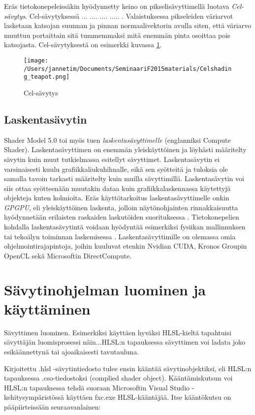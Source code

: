 \documentclass[finnish]{tktltiki2}
\theoremstyle{definition}
\theoremstyle{remark}
\begin{document}
Eräs tietokonepeleissäkin hyödynnetty keino on pikselisävyttimellä luotava \emph{Cel-sävytys}. Cel-sävytyksessä  ... .... .... ..... . Valaistuksessa pikseleiden väriarvot lasketaan katsojan suunnan ja pinnan normaalivektorin avulla siten, että väriarvo muuttuu portaittain sitä tummemmaksi mitä enemmän pinta osoittaa pois katsojasta. Cel-sävytyksestä on esimerkki kuvassa \ref{Cel}.

\begin{figure}[!htbp]
\texttt{[image: /Users/jannetim/Documents/SeminaariF2015materials/Celshading\_teapot.png]}
\caption{Cel-sävytys}
\label{Cel}
\end{figure}

\subsection{Laskentasävytin}

Shader Model 5.0 toi myös tuen \emph{laskentasävyttimelle} (englanniksi Compute Shader). Laskentasävyttimen on enemmän yleiskäyttöinen ja löyhästi määritelty sävytin kuin muut tutkielmassa esitellyt sävyttimet. Laskentasävytin ei varsinaisesti kuulu grafiikkaliukuhihnalle, eikä sen syötteitä ja tuloksia ole samalla tavoin tarkasti määritelty kuin muilla sävyttimillä. Laskentasävytin voi siis ottaa syötteenään muutakin dataa kuin grafiikkalaskennassa käytettyjä objekteja kuten kolmioita. Eräs käyttötarkoitus laskentasävyttimelle onkin \emph{GPGPU}, eli yleiskäyttöinen laskenta, jolloin näytönohjainten rinnakkaisuutta hyödynnetään erilaisten raskaiden laskutöiden suorituksessa \cite{Uni15}. Tietokonepelien kohdalla laskentasävytintä voidaan hyödyntää esimerkiksi fysiikan mallinnuksen tai tekoälyn toiminnan laskemisessa \cite[Luku: Compute Shader Overview]{Mic11}. Laskentasävyttimille on olemassa omia ohjelmointirajapintoja, joihin kuuluvat etenkin Nvidian CUDA, Kronos Groupin OpenCL sekä Microsoftin DirectCompute.

\section{Sävytinohjelman luominen ja käyttäminen}

Sävyttimen luominen. Esimerkiksi käyttäen hyväksi HLSL-kieltä tapahtuisi sävyttäjän luomisprosessi näin...HLSL:n tapauksessa sävyttimen voi ladata joko esikäännettynä tai ajoaikaisesti tavutauluna.

Kirjoitettu .hlsl -sävytintiedosto tulee ensin kääntää sävytinobjektiksi, eli HLSL:n tapauksessa .cso-tiedostoksi (complied shader object). Kääntämiskutsun voi HLSL:n tapauksessa tehdä suoraan Microsoftin Visual Studio -kehitysympäristössä käyttäen fxc.exe HLSL-kääntäjää. Itse kääntökutsu on pääpiirteissään seuraavanlainen:
\end{document}
